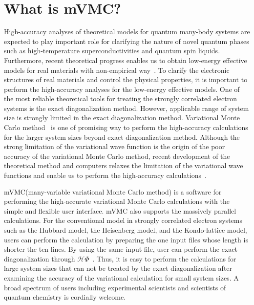 \chapter{What is mVMC?}
High-accuracy analyses of theoretical models
for quantum many-body systems are expected to
play important role for clarifying the nature of
novel quantum phases such as
high-temperature superconductivities and quantum spin liquids.
Furthermore, recent theoretical progress enables us
to obtain low-energy effective models for real materials 
with non-empirical way~\cite{ImadaMiyake}.
To clarify the electronic structures of real materials and
control the physical properties,
it is important to perform the
high-accuracy analyses for the low-energy effective models.
One of the most reliable theoretical tools for treating
the strongly correlated electron systems is the 
exact diagonalization method.
However, applicable range of system size is strongly limited 
in the exact diagonalization method.
Variational Monte Carlo method~\cite{Gros} is one of promising way
to perform the high-accuracy calculations for the larger
system sizes beyond exact diagonalization method.
Although the strong limitation of the variational wave function
is the origin of the poor accuracy of the variational Monte
Carlo method, recent development of the theoretical method and computers
relaxes the limitation of the variational wave functions and
enable us to perform the high-accuracy calculations~\cite{Tahara2008,Misawa2014,Morita2015}.

mVMC(many-variable variational Monte Carlo method)
is a software for performing the high-accurate 
variational Monte Carlo calculations
with the simple and flexible user interface.
mVMC also supports the massively parallel calculations.
For the conventional model in strongly correlated electron systems
such as the Hubbard model, the Heisenberg model, and the Kondo-lattice model,
users can perform the calculation by preparing the one input files whose length is
shorter the ten lines.
By using the same input file,
user can perform the exact diagonalization
through  $\mathcal{H}\Phi$~\cite{HPhi}.
Thus, it is easy to perform the calculations 
for large system sizes that can not be treated 
by the exact diagonalization after examining the accuracy of the
variational calculation for small system sizes.
A broad spectrum of users including experimental scientists and 
scientists of quantum chemistry is cordially welcome.

